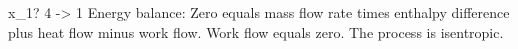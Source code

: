 x_1? 4 -> 1  
Energy balance:  
Zero equals mass flow rate times enthalpy difference plus heat flow minus work flow.  
Work flow equals zero.  
The process is isentropic.